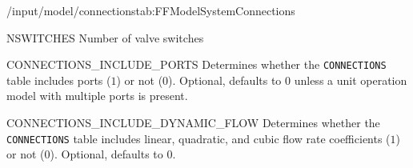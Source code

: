 \begin{groupscope}{/input/model/connections}{tab:FFModelSystemConnections}
  \begin{dataset}[type=int,range={$\geq 1$},length=1]{NSWITCHES}
    Number of valve switches
  \end{dataset}
  \begin{dataset}[type=int,range={$\{ 0,1 \}$},length=1]{CONNECTIONS\_INCLUDE\_PORTS}
    Determines whether the \texttt{CONNECTIONS} table includes ports ($1$) or not ($0$).
    Optional, defaults to $0$ unless a unit operation model with multiple ports is present.
  \end{dataset}
  \begin{dataset}[type=int,range={$\{ 0,1 \}$},length=1]{CONNECTIONS\_INCLUDE\_DYNAMIC\_FLOW}
    Determines whether the \texttt{CONNECTIONS} table includes linear, quadratic, and cubic flow rate coefficients ($1$) or not ($0$).
    Optional, defaults to $0$.
  \end{dataset}
\end{groupscope}

